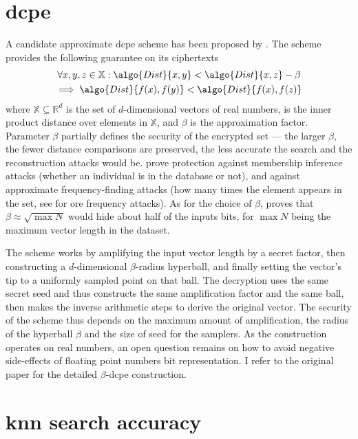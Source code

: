 	\section{\texorpdfstring{\acrlong{dcpe}}{Distance Comparison Preserving Encryption}}

		A candidate approximate \acrshort{dcpe} scheme has been proposed by \textcite{dcpe}.
		The scheme provides the following guarantee on its ciphertexts
		\begin{multline*}
			\forall x, y, z \in \mathbb{X} : \algo{Dist}{x, y} < \algo{Dist}{x, z} - \beta \\
			\implies \algo{Dist}{f(x), f(y)} < \algo{Dist}{f(x), f(z)}
		\end{multline*}
		where $\mathbb{X} \subseteq \mathbb{R}^d$ is the set of $d$-dimensional vectors of real numbers,  is the inner product distance over elements in $\mathbb{X}$, and $\beta$ is the approximation factor.
		Parameter $\beta$ partially defines the security of the encrypted set --- the larger $\beta$, the fewer distance comparisons are preserved, the less accurate the search and the reconstruction attacks would be.
		\textcite{dcpe} prove protection against membership inference attacks \cite{memebership-inference-attacks-knn} (whether an individual is in the database or not), and against approximate frequency-finding attacks (how many times the element appears in the set, see \cite{leakage-abuse-grubs-2017} for \acrshort{ore} frequency attacks).
		As for the choice of $\beta$, \cite{dcpe} proves that $\beta \approx \sqrt{\max N}$ would hide about half of the inputs bits, for $\max N$ being the maximum vector length in the dataset.

		The scheme works by amplifying the input vector length by a secret factor, then constructing a $d$-dimensional $\beta$-radius hyperball, and finally setting the vector's tip to a uniformly sampled point on that ball.
		The decryption uses the same secret seed and thus constructs the same amplification factor and the same ball, then makes the inverse arithmetic steps to derive the original vector.
		The security of the scheme thus depends on the maximum amount of amplification, the radius of the hyperball $\beta$ and the size of seed for the samplers.
		As the construction operates on real numbers, an open question remains on how to avoid negative side-effects of floating point numbers bit representation.
		I refer to the original paper \cite{dcpe} for the detailed $\beta$-\acrshort{dcpe} construction.

	\section{\texorpdfstring{\acrshort{knn}}{kNN} search accuracy}

